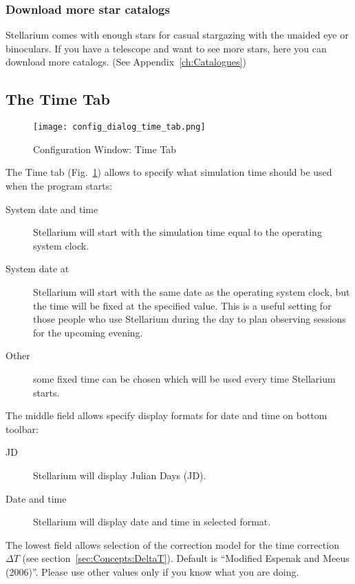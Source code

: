 \subsubsection{Download more star catalogs}
Stellarium comes with enough stars for casual stargazing with the
unaided eye or binoculars. If you have a telescope and want to see
more stars, here you can download more catalogs. (See Appendix~\ref{ch:Catalogues})

\subsection{The Time Tab}
\label{sec:gui:configuration:time}

\begin{figure}[htbp]
\centering\texttt{[image: config\_dialog\_time\_tab.png]}
\caption{Configuration Window: Time Tab}
\label{fig:gui:configuration:time}
\end{figure}

The Time tab (Fig.~\ref{fig:gui:configuration:time}) allows to specify what simulation time should be used
when the program starts:

\begin{description}
\item[System date and time] Stellarium will start with
  the simulation time equal to the operating system clock.
\item[System date at] Stellarium will start with the
  same date as the operating system clock, but the time will be fixed at
  the specified value. This is a useful setting for those people who use
  Stellarium during the day to plan observing sessions for the upcoming
  evening.
\item[Other] some fixed time can be chosen which will
  be used every time Stellarium starts.
\end{description}

\noindent The middle field allows specify display formats for date and time on bottom toolbar:
\begin{description}
\item[JD] Stellarium will display Julian Days (JD).
\item[Date and time] Stellarium will display date and time in selected format.
\end{description}

\noindent The lowest field allows selection of the correction model for the time
correction $\Delta T$ (see section~\ref{sec:Concepts:DeltaT}). Default
is ``Modified Espenak and Meeus (2006)''. Please use other values only if you
know what you are doing.


